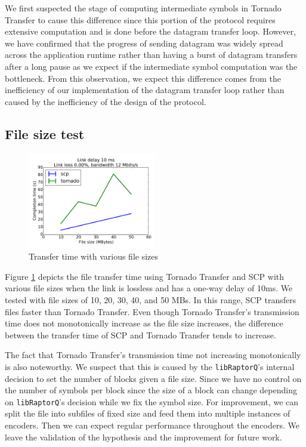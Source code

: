 \documentclass{sig-alternate-10pt}
\begin{document}
We first suspected the stage of computing intermediate symbols in Tornado Transfer to
cause this difference since this portion of the protocol requires extensive
computation and is done before the datagram transfer loop.  However, we have
confirmed that the progress of sending datagram was widely spread across the
application runtime rather than having a burst of datagram transfers after a
long pause as we expect if the intermediate symbol computation was the
bottleneck. From this observation, we expect this difference comes from the
inefficiency of our implementation of the datagram transfer loop rather than
caused by the inefficiency of the design of the protocol.

\subsection{File size test}

\begin{figure}[t]
  \centering
  \includegraphics[width=0.5\textwidth]{filesize-plot}
  \caption{Transfer time with various file sizes}
  \label{f:filesize-plot}
\end{figure}

Figure \ref{f:filesize-plot} depicts the file transfer time using Tornado Transfer and
SCP with various file sizes when the link is lossless and has a one-way delay of
10ms. We tested with file sizes of 10, 20, 30, 40, and 50 MBs. In this range,
SCP transfers files faster than Tornado Transfer. Even though Tornado Transfer's transmission time does
not monotonically increase as the file size increases, the difference between
the transfer time of SCP and Tornado Transfer tends to increase.

The fact that Tornado Transfer's transmission time not increasing monotonically is also
noteworthy. We suspect that this is caused by the \texttt{libRaptorQ}'s internal
decision to set the number of blocks given a file size. Since we have no control
on the number of symbols per block since the size of a block can change
depending on \texttt{libRaptorQ}'s decision while we fix the symbol size. For
improvement, we can split the file into subfiles of fixed size and feed them
into multiple instances of encoders. Then we can expect regular performance
throughout the encoders. We leave the validation of the hypothesis and the
improvement for future work.
\end{document}
